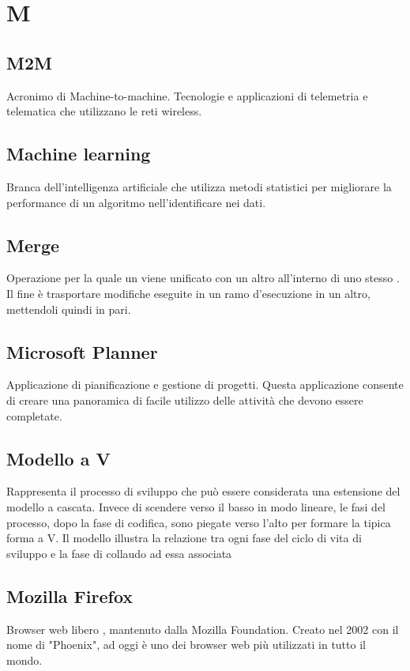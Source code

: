 \section*{M}
\markright{}

\subsection*{M2M}
Acronimo di Machine-to-machine. Tecnologie e applicazioni di telemetria e telematica che utilizzano le reti wireless.

\subsection*{Machine learning}
Branca dell'intelligenza artificiale che utilizza metodi statistici per migliorare la performance di un algoritmo nell'identificare  nei dati.

\subsection*{Merge}
Operazione per la quale un  viene unificato con un altro all'interno di uno stesso . Il fine è trasportare modifiche eseguite in un ramo d'esecuzione in un altro, mettendoli quindi in pari.

\subsection*{Microsoft Planner}
Applicazione di pianificazione e gestione di progetti. Questa applicazione consente di creare una panoramica di facile utilizzo delle attività che devono essere completate.

\subsection*{Modello a V}
Rappresenta il processo di sviluppo  che può essere considerata una estensione del modello a cascata. Invece di scendere verso il basso in modo lineare, le fasi del processo, dopo la fase di codifica, sono piegate verso l'alto per formare la tipica forma a V. Il modello illustra la relazione tra ogni fase del ciclo di vita di sviluppo e la fase di collaudo ad essa associata 

\subsection*{Mozilla Firefox}
Browser web libero , mantenuto dalla Mozilla Foundation. Creato nel 2002 con il nome di "Phoenix", ad oggi è uno dei browser web più utilizzati in tutto il mondo.


